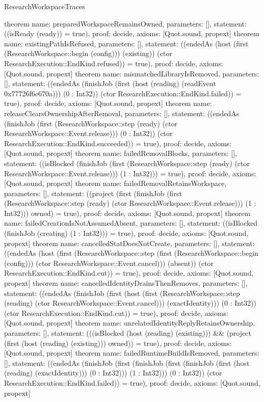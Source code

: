 \begin{lexlean}{ResearchWorkspaceTraces}
\begin{semanticmodule}
theorem{
 name: preparedWorkspaceRemainsOwned,
 parameters: [],
 statement: ((isReady (ready)) = true),
 proof: decide{},
 axioms: [Quot.sound, propext]
}
theorem{
 name: existingPathIsRefused,
 parameters: [],
 statement: ((endedAs (host (first (ResearchWorkspace::begin (config))) (existing)) (ctor ResearchExecution::EndKind.refused)) = true),
 proof: decide{},
 axioms: [Quot.sound, propext]
}
theorem{
 name: mismatchedLibraryIsRemoved,
 parameters: [],
 statement: ((endedAs (finishJob (first (host (reading) (readEvent 0x77726f6e670a))) (0 : Int32)) (ctor ResearchExecution::EndKind.failed)) = true),
 proof: decide{},
 axioms: [Quot.sound, propext]
}
theorem{
 name: releaseClearsOwnershipAfterRemoval,
 parameters: [],
 statement: ((endedAs (finishJob (first (ResearchWorkspace::step (ready) (ctor ResearchWorkspace::Event.release))) (0 : Int32)) (ctor ResearchExecution::EndKind.succeeded)) = true),
 proof: decide{},
 axioms: [Quot.sound, propext]
}
theorem{
 name: failedRemovalBlocks,
 parameters: [],
 statement: ((isBlocked (finishJob (first (ResearchWorkspace::step (ready) (ctor ResearchWorkspace::Event.release))) (1 : Int32))) = true),
 proof: decide{},
 axioms: [Quot.sound, propext]
}
theorem{
 name: failedRemovalRetainsWorkspace,
 parameters: [],
 statement: ((project (first (finishJob (first (ResearchWorkspace::step (ready) (ctor ResearchWorkspace::Event.release))) (1 : Int32))) owned) = true),
 proof: decide{},
 axioms: [Quot.sound, propext]
}
theorem{
 name: failedCreationIsNotAssumedAbsent,
 parameters: [],
 statement: ((isBlocked (finishJob (creating) (1 : Int32))) = true),
 proof: decide{},
 axioms: [Quot.sound, propext]
}
theorem{
 name: cancelledStatDoesNotCreate,
 parameters: [],
 statement: ((endedAs (host (first (ResearchWorkspace::step (first (ResearchWorkspace::begin (config))) (ctor ResearchWorkspace::Event.cancel))) (absent)) (ctor ResearchExecution::EndKind.cut)) = true),
 proof: decide{},
 axioms: [Quot.sound, propext]
}
theorem{
 name: cancelledIdentityDrainsThenRemoves,
 parameters: [],
 statement: ((endedAs (finishJob (first (host (first (ResearchWorkspace::step (reading) (ctor ResearchWorkspace::Event.cancel))) (exactIdentity))) (0 : Int32)) (ctor ResearchExecution::EndKind.cut)) = true),
 proof: decide{},
 axioms: [Quot.sound, propext]
}
theorem{
 name: unrelatedIdentityReplyRetainsOwnership,
 parameters: [],
 statement: (((isBlocked (host (reading) (existing))) && (project (first (host (reading) (existing))) owned)) = true),
 proof: decide{},
 axioms: [Quot.sound, propext]
}
theorem{
 name: failedRuntimeBuildIsRemoved,
 parameters: [],
 statement: ((endedAs (finishJob (first (finishJob (first (finishJob (first (host (reading) (exactIdentity))) (0 : Int32))) (1 : Int32))) (0 : Int32)) (ctor ResearchExecution::EndKind.failed)) = true),
 proof: decide{},
 axioms: [Quot.sound, propext]
}


\end{semanticmodule}
\end{lexlean}
